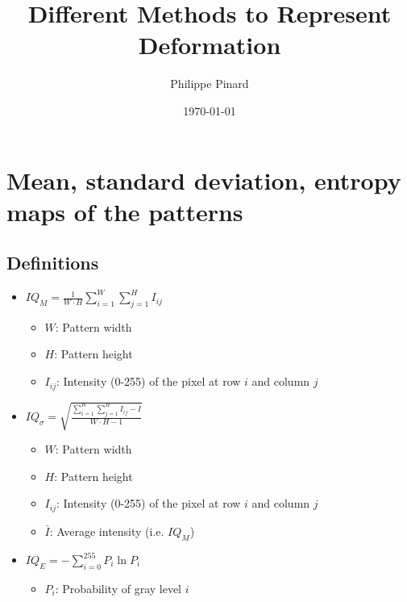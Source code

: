 \documentclass[letterpaper]{article}
\title{Different Methods to Represent Deformation}
\author{Philippe Pinard}
\date{\today}
\begin{document}
	\pagestyle{fancy}
	\fancyhf{}
	\setlength{\headheight}{15pt}
	\setlength{\headsep}{10pt}
	\rhead{\today}
	\rfoot{\thepage}
	
	\section{Mean, standard deviation, entropy maps of the patterns}
		\subsection{Definitions}
			\begin{itemize}
				\item $IQ_M = \frac{1}{W\cdot H} \sum\limits_{i=1}^{W}{\sum\limits_{j=1}^{H}{I_{ij}}}$
					\begin{itemize}
						\item $W$: Pattern width
						\item $H$: Pattern height
						\item $I_{ij}$: Intensity (0-255) of the pixel at row $i$ and column $j$
					\end{itemize}
				\item $IQ_\sigma = \sqrt{\frac{\sum\limits_{i=1}^{W}{\sum\limits_{j=1}^{H}{I_{ij} - \bar{I}}}}{W\cdot H - 1}}$
					\begin{itemize}
						\item $W$: Pattern width
						\item $H$: Pattern height
						\item $I_{ij}$: Intensity (0-255) of the pixel at row $i$ and column $j$
						\item $\bar{I}$: Average intensity (i.e. $IQ_M$)
					\end{itemize}
				\item $IQ_E = - \sum\limits_{i=0}^{255}{P_i\ln{P_i}}$
					\begin{itemize}
						\item $P_i$: Probability of gray level $i$
					\end{itemize}
			\end{itemize}
		
\end{document}
